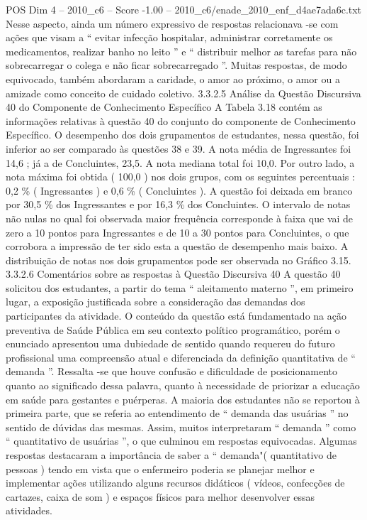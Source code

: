 \begin{textsample}{POS Dim 4 – 2010\_c6 – Score -1.00 – 2010\_c6/enade\_2010\_enf\_d4ae7ada6c.txt}
Nesse aspecto, ainda um número expressivo de respostas relacionava -se com ações que visam a “ evitar infecção hospitalar, administrar corretamente os medicamentos, realizar banho no leito ” e “ distribuir melhor as tarefas para não sobrecarregar o colega e não ficar sobrecarregado ”.
Muitas respostas, de modo equivocado, também abordaram a caridade, o amor ao próximo, o amor ou a amizade como conceito de cuidado coletivo. 3.3.2.5 Análise da Questão Discursiva 40 do Componente de Conhecimento Específico A Tabela 3.18 contém as informações relativas à questão 40 do conjunto do componente de Conhecimento Específico.
O desempenho dos dois grupamentos de estudantes, nessa questão, foi inferior ao ser comparado às questões 38 e 39.
A nota média de Ingressantes foi 14,6 ; já a de Concluintes, 23,5.
A nota mediana total foi 10,0.
Por outro lado, a nota máxima foi obtida ( 100,0 ) nos dois grupos, com os seguintes percentuais : 0,2 \% ( Ingressantes ) e 0,6 \% ( Concluintes ).
A questão foi deixada em branco por 30,5 \% dos Ingressantes e por 16,3 \% dos Concluintes.
O intervalo de notas não nulas no qual foi observada maior frequência corresponde à faixa que vai de zero a 10 pontos para Ingressantes e de 10 a 30 pontos para Concluintes, o que corrobora a impressão de ter sido esta a questão de desempenho mais baixo.
A distribuição de notas nos dois grupamentos pode ser observada no Gráfico 3.15. 3.3.2.6 Comentários sobre as respostas à Questão Discursiva 40 A questão 40 solicitou dos estudantes, a partir do tema “ aleitamento materno ”, em primeiro lugar, a exposição justificada sobre a consideração das demandas dos participantes da atividade.
O conteúdo da questão está fundamentado na ação preventiva de Saúde Pública em seu contexto político programático, porém o enunciado apresentou uma dubiedade de sentido quando requereu do futuro profissional uma compreensão atual e diferenciada da definição quantitativa de “ demanda ”.
Ressalta -se que houve confusão e dificuldade de posicionamento quanto ao significado dessa palavra, quanto à necessidade de priorizar a educação em saúde para gestantes e puérperas.
A maioria dos estudantes não se reportou à primeira parte, que se referia ao entendimento de “ demanda das usuárias ” no sentido de dúvidas das mesmas.
Assim, muitos interpretaram “ demanda ” como “ quantitativo de usuárias ”, o que culminou em respostas equivocadas.
Algumas respostas destacaram a importância de saber a “ demanda"( quantitativo de pessoas ) tendo em vista que o enfermeiro poderia se planejar melhor e implementar ações utilizando alguns recursos didáticos ( vídeos, confecções de cartazes, caixa de som ) e espaços físicos para melhor desenvolver essas atividades.

\end{textsample}
